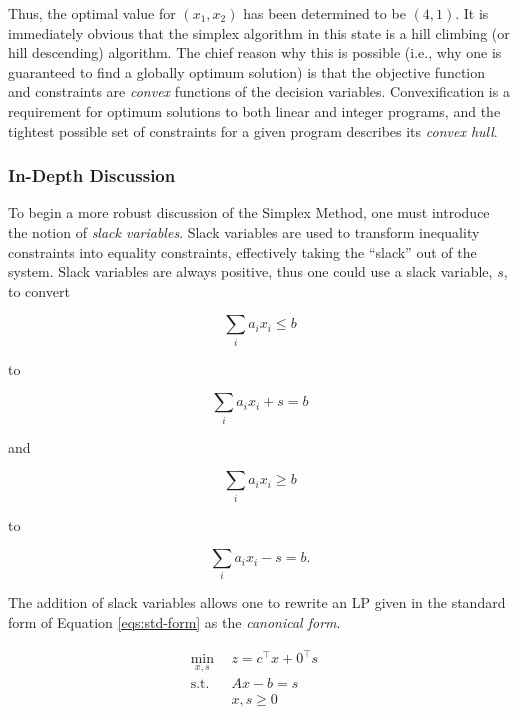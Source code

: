 Thus, the optimal value for $(x_1, x_2)$ has been determined to be $(4, 1)$. It
is immediately obvious that the simplex algorithm in this state is a hill
climbing (or hill descending) algorithm. The chief reason why this is possible
(i.e., why one is guaranteed to find a globally optimum solution) is that the
objective function and constraints are \textit{convex} functions of the decision
variables. Convexification is a requirement for optimum solutions to both linear
and integer programs, and the tightest possible set of constraints for a given
program describes its \textit{convex hull}.

\subsubsection{In-Depth Discussion}
To begin a more robust discussion of the Simplex Method, one must introduce the
notion of \textit{slack variables}. Slack variables are used to transform
inequality constraints into equality constraints, effectively taking the
``slack'' out of the system. Slack variables are always positive, thus one could
use a slack variable, $s$, to convert

\begin{equation}
  \sum_{i} a_i x_i \leq b
\end{equation}

to 

\begin{equation}
  \sum_{i} a_i x_i + s = b
\end{equation}

and

\begin{equation}
  \sum_{i} a_i x_i \geq b
\end{equation}

to 

\begin{equation}
  \sum_{i} a_i x_i - s = b.
\end{equation}

The addition of slack variables allows one to rewrite an LP given in the
standard form of Equation \ref{eqs:std-form} as the \textit{canonical form}.

\begin{subequations}\label{eqs:can-form}
  \begin{align}
    \min_{x, s} \:\: & 
    z =  c^{\top} x + 0^{\top} s
    & \label{eqs:can-form_obj} \\
    \text{s.t.} \:\: &
    A x - b = s
    & \label{eqs:can-form_sup} \\
    &
    x, s \geq 0
    &\label{eqs:can-form_x}
  \end{align}
\end{subequations}

